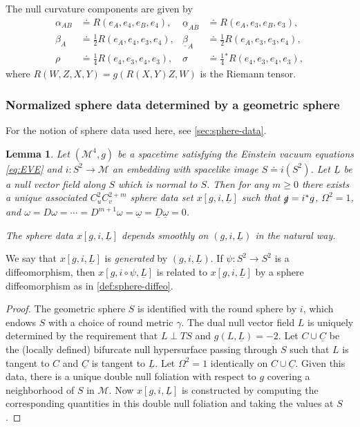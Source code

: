 \documentclass[10pt]{article}
\numberwithin{equation}{section}
\theoremstyle{plain}
\newtheorem{lem}{Lemma}[section]
\theoremstyle{definition}
\begin{document}
\begin{appendix}
The null curvature components are given by 
\begin{align*}
\alpha_{AB}    &\doteq R(e_A,e_4,e_B,e_4), & \underline\alpha_{AB} &\doteq R(e_A,e_3,e_B,e_3), \\
\beta_A    &\doteq \tfrac 12 R(e_A,e_4,e_3,e_4), & \underline\beta_A&\doteq \tfrac 12 R(e_A,e_3,e_3,e_4),\\
\rho     &\doteq \tfrac 14 R(e_4,e_3,e_4,e_3), & \sigma&\doteq \tfrac 14 {}^*R(e_4,e_3,e_4,e_3),
\end{align*}
where $R(W,Z,X,Y)=g(R(X,Y)Z,W)$ is the Riemann tensor.

\subsubsection{Normalized sphere data determined by a geometric sphere}

For the notion of sphere data used here, see \cref{sec:sphere-data}. 

\begin{lem}\label{lem:data-generation}
    Let $(\mathcal M^4,g)$ be a spacetime satisfying the Einstein vacuum equations \eqref{eq:EVE} and $i:S^2 \to \mathcal M$ an embedding with spacelike image $S\doteq i(S^2)$. Let $\underline L$ be a null vector field along $S$ which is normal to $S$. Then for any $m\ge 0$ there exists a unique associated $C^2_uC^{2+m}_v$ sphere data set $x[g,i,\underline L]$ such that $\slashed g=i^*g$, $\Omega^2=1$, and  $\omega=D\omega=\cdots = D^{m+1}\omega=\underline\omega=\underline D\underline\omega=0$.

    The sphere data $x[g,i,\underline L]$ depends smoothly on $(g,i,\underline L)$ in the natural way. 
\end{lem}
We say that $x[g,i,\underline L]$ is \emph{generated} by $(g,i,\underline L)$. If $\psi:S^2\to S^2$ is a diffeomorphism, then $x[g,i\circ\psi,\underline L]$ is related to $x[g,i,\underline L]$ by a sphere diffeomorphism as in \cref{def:sphere-diffeo}. 
\begin{proof}
    The geometric sphere $S$ is identified with the round sphere by $i$, which endows $S$ with a choice of round metric $\gamma$. The dual null vector field $L$ is uniquely determined by the requirement that $L\perp TS$ and $g(L,\underline L)=-2$. Let $C\cup \underline C$ be the (locally defined) bifurcate null hypersurface passing through $S$ such that $L$ is tangent to $C$ and $\underline C$ is tangent to $\underline L$. Let $\Omega^2=1$ identically on $C\cup\underline C$. Given this data, there is a unique double null foliation with respect to $g$ covering a neighborhood of $S$ in $\mathcal M$. Now $x[g,i,\underline L]$ is constructed by computing the corresponding quantities in this double null foliation and taking the values at $S$. 
\end{proof}


\end{appendix}
\end{document}
